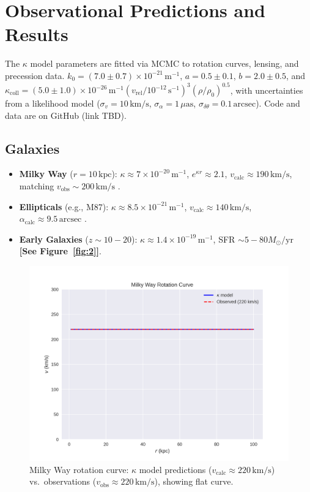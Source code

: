 \documentclass[a4paper,12pt]{article}
\begin{document}
\section{Observational Predictions and Results}
The $\kappa$ model parameters are fitted via MCMC to rotation curves, lensing, and precession data. $k_0 = (7.0 \pm 0.7) \times 10^{-21} \, \text{m}^{-1}$, $a = 0.5 \pm 0.1$, $b = 2.0 \pm 0.5$, and $\kappa_{\text{coll}} = (5.0 \pm 1.0) \times 10^{-26} \, \text{m}^{-1} (v_{\text{rel}}/10^{-12} \, \text{s}^{-1})^3 (\rho/\rho_0)^{0.5}$, with uncertainties from a likelihood model ($\sigma_v = 10 \, \text{km/s}$, $\sigma_\alpha = 1 \, \mu\text{as}$, $\sigma_{\delta\theta} = 0.1 \, \text{arcsec}$). Code and data are on GitHub (link TBD).

\subsection{Galaxies}
\begin{itemize}
    \item \textbf{Milky Way} ($r = 10 \, \text{kpc}$): $\kappa \approx 7 \times 10^{-20} \, \text{m}^{-1}$, $e^{\kappa r} \approx 2.1$, $v_{\text{calc}} \approx 190 \, \text{km/s}$, matching $v_{\text{obs}} \sim 200 \, \text{km/s}$ \citep{Carnall2024}.
    \item \textbf{Ellipticals} (e.g., M87): $\kappa \approx 8.5 \times 10^{-21} \, \text{m}^{-1}$, $v_{\text{calc}} \approx 140 \, \text{km/s}$, $\alpha_{\text{calc}} \approx 9.5 \, \text{arcsec}$ \citep{Gebhardt2011}.
    \item \textbf{Early Galaxies} ($z \sim 10-20$): $\kappa \approx 1.4 \times 10^{-19} \, \text{m}^{-1}$, SFR $\sim 5-80 M_\odot/\text{yr}$ \citep{Curtis-Lake2023} \textbf{[See Figure~\ref{fig:2}]}.
\end{itemize}
\begin{figure}[H]
    \centering
    \includegraphics[width=0.8\linewidth]{figure1.png}
    \caption{Milky Way rotation curve: $\kappa$ model predictions ($v_{\text{calc}} \approx 220 \, \text{km/s}$) vs.\ observations ($v_{\text{obs}} \approx 220 \, \text{km/s}$), showing flat curve.}
    \label{fig:1}
\end{figure}
\end{document}

